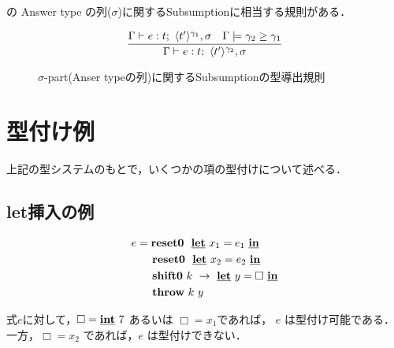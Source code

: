\Shiftz の Answer type の列($\sigma$)に関するSubsumptionに相当する規則がある．

\begin{figure}[H]
  \centering
  \[
    \infer
    {\Gamma \vdash e : t;~\codeT{t'}{\gamma_2},\sigma}
    {\Gamma \vdash e : t;~\codeT{t'}{\gamma_1},\sigma
      & \Gamma \models \gamma_2 \ord \gamma_1
    }
  \]
  \caption{$\sigma$-part(Anser typeの列)に関するSubsumptionの型導出規則}
  \label{fig:sigma_subs_type_rule}
\end{figure}

\section{型付け例}

上記の型システムのもとで，いくつかの項の型付けについて述べる．

\subsection{let挿入の例}
\label{subsec:exam-let}


\begin{align*}
  e & = \textbf{reset0} ~~\underline{\textbf{let}}~x_1= e_1 ~\underline{\textbf{in}} \\
    & \phantom{=}~~ \textbf{reset0} ~~\underline{\textbf{let}}~x_2= e_2~\underline{\textbf{in}} \\
    & \phantom{=}~~ \textbf{shift0}~k~\to~\underline{\textbf{let}}~y=\Box~\underline{\textbf{in}} \\
    & \phantom{=}~~ \textbf{throw}~ k~ y
\end{align*}

式$e$に対して，$\Box=\underline{\textbf{int}}~ 7$ あるいは $\Box=x_1$であれば，
$e$ は型付け可能である．
一方，$\Box=x_2$ であれば，$e$ は型付けできない．

\newcommand\tzero{\codeT{t}{\gamma_0}}
\newcommand\tone{\codeT{t}{\gamma_1}}
\newcommand\ttwo{\codeT{t}{\gamma_2}}
\newcommand\tthree{\codeT{t}{\gamma_3}}
\newcommand\tonethree{\codeT{t}{\gamma_1\uni\gamma_3}}
\newcommand\tall{\codeT{t}{\gamma_2\uni\gamma_1\uni\gamma_3}}
\newcommand\Gammaone{
  \longer{\gamma_1}{\gamma_0},~x_1:\tone \vdash
  \cLet~x_2=e_2~\cIn~\cdots : \tone;~\tone,\tzero}
\newcommand\Gammatwo{
  \Gamma_1,~k_2:\contT{\ttwo}{\tone}{\tzero},
  ~k_1:\contT{\tone}{\tzero}{\cdot{}}}

\def\proofone{
  \infer
  {\vdash e_1:\tzero;~\cdot{}}
  {
    \infer{\vdash \cLet~x_1=e_1~\cIn~\Resetz~\cLet~x_2=e_2~\cIn~\cdots :
      \tzero;~\tzero
    }
    {\infer{\longer{\gamma_1}{\gamma_0},~x_1:\tone \vdash
        \Resetz~\cLet~x_2=e_2~\cIn~\cdots : \tone;~\tzero
      }
      {\prooftwo}
    }
  }
}
\def\prooftwo{
  \infer{\longer{\gamma_1}{\gamma_0},~x_1:\tone \vdash
    \cLet~x_2=e_2~\cIn~\cdots : \tone;~\tone,\tzero}
  {\infer{\Gamma_1=\longer{\gamma_2}{\gamma_1},~x_2:\ttwo,~\longer{\gamma_1}{\gamma_0},~x_1:\tone \vdash
      \shiftz{k}{\cdots} : \ttwo;~\tone,\tzero
    }
    {\proofthree}
  }
}

